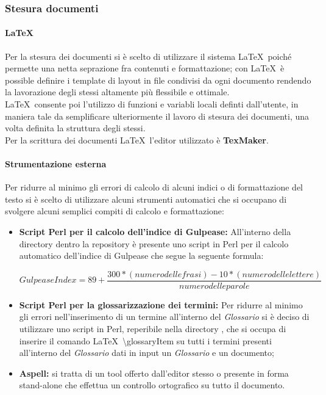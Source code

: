     \subsubsection{Stesura documenti}
      \paragraph{\LaTeX}
        Per la stesura dei documenti si è scelto di utilizzare il sistema \LaTeX\ poiché permette una netta seprazione fra contenuti
        e formattazione; con \LaTeX\ è possible definire i template di layout in file condivisi da ogni documento rendendo la lavorazione
        degli stessi altamente più flessibile e ottimale.\\
        \LaTeX\ consente poi l'utilizzo di funzioni e variabli locali definti dall'utente, in maniera tale da semplificare ulteriormente
        il lavoro di stesura dei documenti, una volta definita la struttura degli stessi.\\
        Per la scrittura dei documenti \LaTeX\ l'editor utilizzato è \textbf{TexMaker}.
      \paragraph{Strumentazione esterna}
        Per ridurre al minimo gli errori di calcolo di alcuni indici o di formattazione del testo si è scelto di utilizzare alcuni strumenti
        automatici che si occupano di svolgere alcuni semplici compiti di calcolo e formattazione:
        \begin{itemize}
          \item \textbf{Script Perl per il calcolo dell'indice di Gulpease: }All'interno della directory  dentro la repository è presente
          uno script in Perl per il calcolo automatico dell'indice di Gulpease che segue la seguente formula:
          \begin{center}
            \begin{equation}
              Gulpease Index = 89+\frac{300*( numero delle frasi ) - 10*( numero delle lettere )}{numero delle parole}
            \end{equation}
          \end{center}
          \item \textbf{Script Perl per la glossarizzazione dei termini: }Per ridurre al minimo gli errori nell'inserimento di un termine all'interno
          del \emph{Glossario} si è deciso di utilizzare uno script in Perl, reperibile nella directory , che si occupa di inserire
          il comando \LaTeX\ \textbackslash glossaryItem{} su tutti i termini presenti all'interno del \emph{Glossario} dati in input un \emph{Glossario}
          e un documento;
          \item \textbf{Aspell: }si tratta di un tool offerto dall'editor stesso o presente in forma stand-alone che effettua un controllo ortografico
          su tutto il documento.
        \end{itemize}
